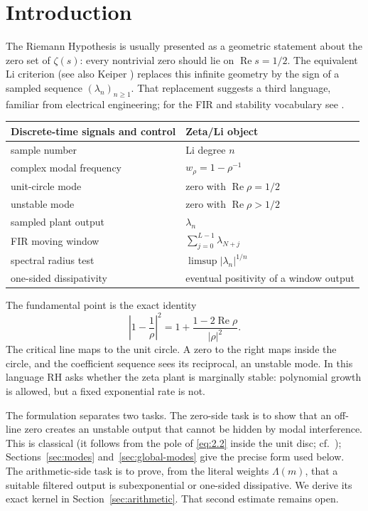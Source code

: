 \documentclass[11pt]{amsart}
\numberwithin{equation}{section}
\theoremstyle{definition}
\theoremstyle{remark}
\renewcommand{\Re}{\operatorname{Re}}
\begin{document}
\tableofcontents
\newpage

\section{Introduction}

The Riemann Hypothesis is usually presented as a geometric statement about
the zero set of \(\zeta(s)\): every nontrivial zero should lie on
\(\Re s=1/2\). The equivalent Li criterion \cite{Li,BombieriLagarias}
(see also Keiper \cite{Keiper}) replaces this infinite geometry
by the sign of a sampled sequence \((\lambda_n)_{n\ge1}\). That replacement
suggests a third language, familiar from electrical engineering; for the
FIR and stability vocabulary see \cite{Oppenheim,Kailath}.

\begin{center}
\begin{tabular}{>{\raggedright\arraybackslash}p{}
                >{\raggedright\arraybackslash}p{}}
\toprule
Discrete-time signals and control & Zeta/Li object\\
\midrule
sample number & Li degree \(n\)\\
complex modal frequency & \(w_\rho=1-\rho^{-1}\)\\
unit-circle mode & zero with \(\Re\rho=1/2\)\\
unstable mode & zero with \(\Re\rho>1/2\)\\
sampled plant output & \(\lambda_n\)\\
FIR moving window & \(\sum_{j=0}^{L-1}\lambda_{N+j}\)\\
spectral radius test & \(\limsup|\lambda_n|^{1/n}\)\\
one-sided dissipativity & eventual positivity of a window output\\
\bottomrule
\end{tabular}
\end{center}

The fundamental point is the exact identity
\[
 \left|1-\frac1\rho\right|^2
 =1+\frac{1-2\Re\rho}{|\rho|^2}.
\]
The critical line maps to the unit circle. A zero to the right maps inside
the circle, and the coefficient sequence sees its reciprocal, an unstable
mode. In this language RH asks whether the zeta plant is marginally stable:
polynomial growth is allowed, but a fixed exponential rate is not.

The formulation separates two tasks. The zero-side task is to show that an
off-line zero creates an unstable output that cannot be hidden by modal
interference. This is classical (it follows from the pole of
\eqref{eq:2.2} inside the unit disc; cf.\ \cite{Li,BombieriLagarias});
Sections~\ref{sec:modes} and~\ref{sec:global-modes} give the precise form
used below. The
arithmetic-side task is to prove, from the literal weights \(\Lambda(m)\),
that a suitable filtered output is subexponential or one-sided dissipative.
We derive its exact kernel in Section~\ref{sec:arithmetic}. That second
estimate remains open.
\end{document}
